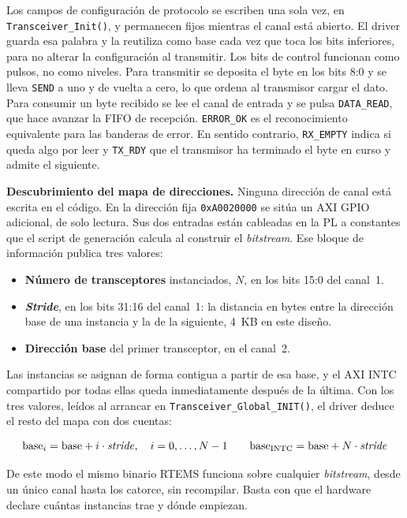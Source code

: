 Los campos de configuración de protocolo se escriben una sola vez, en
\texttt{Transceiver\_\allowbreak Init()}, y permanecen fijos mientras el canal está abierto. El driver guarda
esa palabra y la reutiliza como base cada vez que toca los bits inferiores, para no alterar la
configuración al transmitir. Los bits de control funcionan como pulsos, no como niveles. Para
transmitir se deposita el byte en los bits 8:0 y se lleva \texttt{SEND} a uno y de vuelta a cero, lo
que ordena al transmisor cargar el dato. Para consumir un byte recibido se lee el canal de entrada y
se pulsa \texttt{DATA\_READ}, que hace avanzar la FIFO de recepción. \texttt{ERROR\_OK} es el
reconocimiento equivalente para las banderas de error. En sentido contrario, \texttt{RX\_EMPTY}
indica si queda algo por leer y \texttt{TX\_RDY} que el transmisor ha terminado el byte en curso y
admite el siguiente.

\textbf{Descubrimiento del mapa de direcciones.} Ninguna dirección de canal está escrita en el
código. En la dirección fija \texttt{0xA0020000} se sitúa un AXI GPIO adicional, de solo lectura.
Sus dos entradas están cableadas en la PL a constantes que el script de generación calcula al
construir el \textit{bitstream}. Ese bloque de información publica tres valores:

\begin{itemize}
    \item \textbf{Número de transceptores} instanciados, $N$, en los bits 15:0 del canal~1.
    \item \textbf{\textit{Stride}}, en los bits 31:16 del canal~1: la distancia en bytes entre la
          dirección base de una instancia y la de la siguiente, 4~KB en este diseño.
    \item \textbf{Dirección base} del primer transceptor, en el canal~2.
\end{itemize}

Las instancias se asignan de forma contigua a partir de esa base, y el AXI INTC compartido por todas
ellas queda inmediatamente después de la última. Con los tres valores, leídos al arrancar en
\texttt{Transceiver\_Global\_INIT()}, el driver deduce el resto del mapa con dos cuentas:

\[
    \text{base}_i = \text{base} + i \cdot \text{\textit{stride}}, \quad i = 0,\dots,N-1
    \qquad
    \text{base}_{\text{INTC}} = \text{base} + N \cdot \text{\textit{stride}}
\]

De este modo el mismo binario RTEMS funciona sobre cualquier \textit{bitstream}, desde un único
canal hasta los catorce, sin recompilar. Basta con que el hardware declare cuántas instancias trae
y dónde empiezan.

